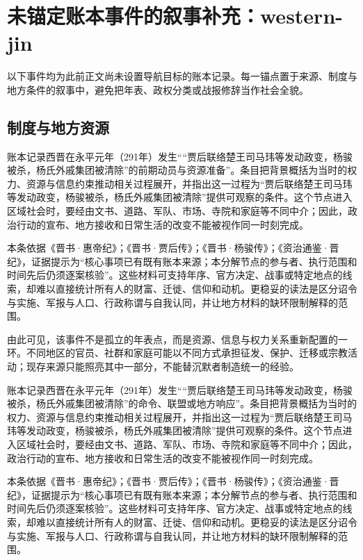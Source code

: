 \section{未锚定账本事件的叙事补充：western-jin}

\label{sec:anchor-batch-two-western-jin}

以下事件均为此前正文尚未设置导航目标的账本记录。每一锚点置于来源、制度与地方条件的叙事中，避免把年表、政权分类或战报修辞当作社会全貌。

\subsection{制度与地方资源}

账本记录西晋在永平元年（291年）发生““贾后联络楚王司马玮等发动政变，杨骏被杀，杨氏外戚集团被清除”的前期动员与资源准备”。条目把背景概括为当时的权力、资源与信息约束推动相关过程展开，并指出这一过程为“贾后联络楚王司马玮等发动政变，杨骏被杀，杨氏外戚集团被清除”提供可观察的条件。这个节点进入区域社会时，要经由文书、道路、军队、市场、寺院和家庭等不同中介；因此，政治行动的宣布、地方接收和日常生活的改变不能被视作同一时刻完成。

本条依据《晋书·惠帝纪》；《晋书·贾后传》；《晋书·杨骏传》；《资治通鉴·晋纪》，证据提示为“核心事项已有既有账本来源；本分解节点的参与者、执行范围和时间先后仍须逐案核验”。这些材料可支持年序、官方决定、战事或特定地点的线索，却难以直接统计所有人的财富、迁徙、信仰和动机。更稳妥的读法是区分诏令与实施、军报与人口、行政称谓与自我认同，并让地方材料的缺环限制解释的范围。

由此可见，该事件不是孤立的年表点，而是资源、信息与权力关系重新配置的一环。不同地区的官员、社群和家庭可能以不同方式承担征发、保护、迁移或宗教活动；现存来源只能照亮其中一部分，不能替沉默者制造统一的经验。

账本记录西晋在永平元年（291年）发生““贾后联络楚王司马玮等发动政变，杨骏被杀，杨氏外戚集团被清除”的命令、联盟或地方响应”。条目把背景概括为当时的权力、资源与信息约束推动相关过程展开，并指出这一过程为“贾后联络楚王司马玮等发动政变，杨骏被杀，杨氏外戚集团被清除”提供可观察的条件。这个节点进入区域社会时，要经由文书、道路、军队、市场、寺院和家庭等不同中介；因此，政治行动的宣布、地方接收和日常生活的改变不能被视作同一时刻完成。

本条依据《晋书·惠帝纪》；《晋书·贾后传》；《晋书·杨骏传》；《资治通鉴·晋纪》，证据提示为“核心事项已有既有账本来源；本分解节点的参与者、执行范围和时间先后仍须逐案核验”。这些材料可支持年序、官方决定、战事或特定地点的线索，却难以直接统计所有人的财富、迁徙、信仰和动机。更稳妥的读法是区分诏令与实施、军报与人口、行政称谓与自我认同，并让地方材料的缺环限制解释的范围。

